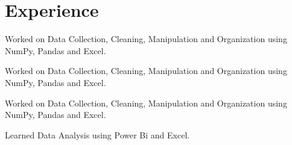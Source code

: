 \documentclass[]{m abbas resume' 2022}
\begin{document}
\begin{minipage}[t]{0.51\textwidth} 
    

    
\section{Experience}
\vspace{\topsep} %
\begin{tightemize}
\sectionsep
\item Worked on Data Collection, Cleaning, Manipulation and Organization using
    NumPy, Pandas and Excel.
\end{tightemize}  
\begin{tightemize}
\sectionsep
\item Worked on Data Collection, Cleaning, Manipulation and Organization using
    NumPy, Pandas and Excel.
\end{tightemize}  
\begin{tightemize}
\sectionsep
\item Worked on Data Collection, Cleaning, Manipulation and Organization using
    NumPy, Pandas and Excel.
\end{tightemize}  
  
\begin{tightemize}
\sectionsep
\item Learned Data Analysis using Power Bi and Excel. 
\end{tightemize}


\end{minipage}
\end{document}
